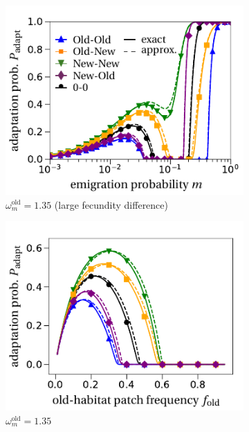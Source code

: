 \documentclass[a4paper,11pt]{article}
\begin{document}
\begin{figure}[t!]
	\centering
		\begin{subfigure}{.5\textwidth}
 		 \centering
 		 \includegraphics[width=\linewidth]{fig3a.pdf}
  		\caption{$\omega^\text{old}_m=1.35$ (large fecundity difference)}
	\end{subfigure}%
	    \begin{subfigure}{.5\textwidth}
 		 \centering
 		 \includegraphics[width=\linewidth]{fig3b.pdf}
  		\caption{$\omega^\text{old}_m=1.35$}
	\end{subfigure}
	\begin{subfigure}{.5\textwidth}

\end{subfigure}
\end{figure}
\end{document}
